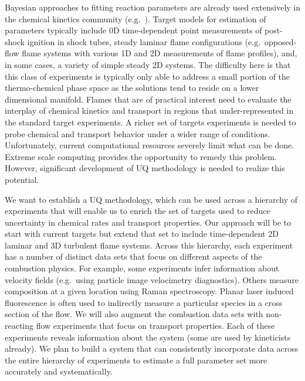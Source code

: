 \documentclass[11pt]{article}
\newcommand{\MarginPar}[1]{\marginpar{%
\vskip-\baselineskip %
\raggedright\tiny\sffamily
\hrule\smallskip{\color{red}#1}\par\smallskip\hrule}}
\begin{document}
Bayesian approaches to fitting reaction parameters are already used
extensively in the chemical kinetics community (e.g.\ \cite{Kseib2011,Urzay2012}).
Target models for estimation of parameters typically include
0D time-dependent point measurements of post-shock ignition in shock
tubes, steady laminar flame configurations (e.g.\ opposed-flow flame
systems with various 1D and 2D measurements of flame profiles), and, in some
cases, a variety of simple steady 2D systems.
The difficulty here is that this class of experiments is typically only able to
address a small portion of the thermo-chemical phase space as the solutions tend to 
reside on a lower dimensional manifold. 
Flames that are of practical interest need to evaluate
the interplay of chemical kinetics and transport in regions that under-represented in the standard target
experiments.
A richer set of targets experiments is needed to probe chemical
and transport behavior under a wider range of conditions.
Unfortunately, current computational resources severely limit
what can be done.
Extreme scale computing provides the opportunity to remedy this
problem.
However, significant development of UQ methodology is
needed to realize this potential.

We want to establish a UQ methodology, which can be used across a
hierarchy of experiments that will enable us to enrich the set
of targets used to reduce uncertainty in chemical rates and transport properties.
Our approach will be to start with current targets
but extend that set to include
time-dependent 2D laminar and 3D turbulent flame systems.  Across this
hierarchy, each experiment has a number of distinct data sets that
focus on different aspects of the combustion physics.
For example, some
experiments infer information about velocity fields (e.g.\ using
particle image velocimetry diagnostics). Others measure composition at
a given location using Raman spectroscopy.
Planar laser induced
fluorescence is often used to indirectly measure a particular species
in a cross section of the flow.
We will also augment the
combustion data sets with non-reacting flow experiments that focus on
transport properties.
Each of these experiments reveals information
about the system (some are used by kineticists already).  We plan to
build a system that can consistently incorporate data across the
entire hierarchy of experiments to estimate a full parameter set more
accurately and systematically.
\end{document}
